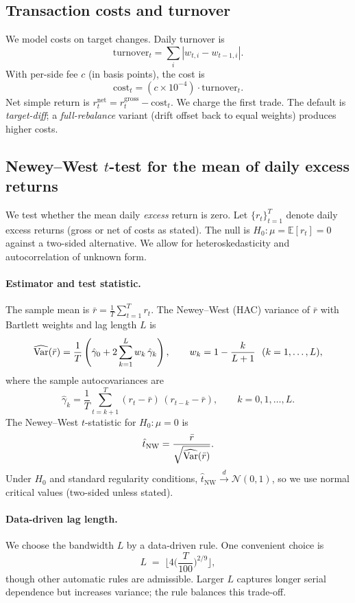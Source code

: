 \subsection{Transaction costs and turnover}
We model costs on target changes. Daily turnover is
\[
\mathrm{turnover}_t=\sum_i |w_{t,i}-w_{t-1,i}|.
\]
With per-side fee $c$ (in basis points), the cost is
\[
\mathrm{cost}_t=(c\times 10^{-4})\cdot \mathrm{turnover}_t.
\]
Net simple return is $r^{\text{net}}_t=r^{\text{gross}}_t-\mathrm{cost}_t$. We charge the first trade. The default is \emph{target-diff}; a \emph{full-rebalance} variant (drift offset back to equal weights) produces higher costs.

\subsection{Newey--West $t$-test for the mean of daily excess returns}\label{sec:newey-west}
We test whether the mean daily \emph{excess} return is zero. Let $\{r_t\}_{t=1}^{T}$ denote daily excess returns (gross or net of costs as stated). The null is $H_0:\mu=\mathbb{E}[r_t]=0$ against a two-sided alternative. We allow for heteroskedasticity and autocorrelation of unknown form.

\paragraph{Estimator and test statistic.}
The sample mean is $\bar r=\frac{1}{T}\sum_{t=1}^{T} r_t$. The Newey--West (HAC) variance of $\bar r$ with Bartlett weights and lag length $L$ is
\[
\widehat{\operatorname{Var}}(\bar r)
=\frac{1}{T}\left(
\hat\gamma_0 + 2\sum_{k=1}^{L} w_k\,\hat\gamma_k
\right),
\qquad
w_k = 1-\frac{k}{L+1}\ \ (k=1,\dots,L),
\]
where the sample autocovariances are
\[
\hat\gamma_k
=\frac{1}{T}\sum_{t=k+1}^{T} (r_t-\bar r)\,(r_{t-k}-\bar r),
\qquad k=0,1,\dots,L.
\]
The Newey--West $t$-statistic for $H_0:\mu=0$ is
\[
\hat t_{\text{NW}}
=\frac{\bar r}{\sqrt{\widehat{\operatorname{Var}}(\bar r)}}.
\]
Under $H_0$ and standard regularity conditions, $\hat t_{\text{NW}} \overset{d}{\to} \mathcal{N}(0,1)$, so we use normal critical values (two-sided unless stated).

\paragraph{Data-driven lag length.}
We choose the bandwidth $L$ by a data-driven rule. One convenient choice is
\[
L \;=\; \Big\lfloor 4\Big(\frac{T}{100}\Big)^{2/9} \Big\rfloor,
\]
though other automatic rules are admissible. Larger $L$ captures longer serial dependence but increases variance; the rule balances this trade-off.


